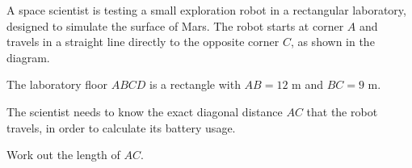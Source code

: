 \begin{question}
\noindent A space scientist is testing a small exploration robot in a rectangular laboratory, designed to simulate the surface of Mars. The robot starts at corner $A$ and travels in a straight line directly to the opposite corner $C$, as shown in the diagram.

The laboratory floor $ABCD$ is a rectangle with $AB = 12$ m and $BC = 9$ m.

\begin{center}
\end{center}

\noindent The scientist needs to know the exact diagonal distance $AC$ that the robot travels, in order to calculate its battery usage.

\noindent Work out the length of $AC$.
\vspace{4cm}
\begin{flushright}
\end{flushright}
\end{question}
